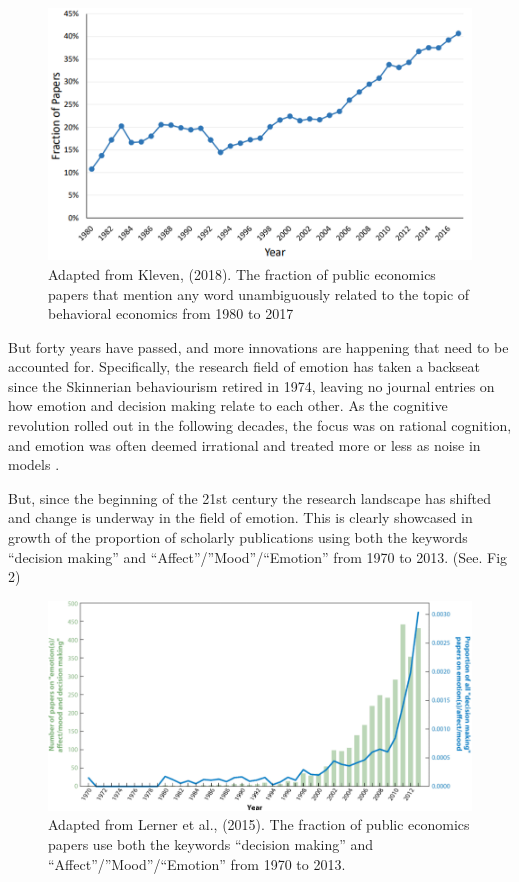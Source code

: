 \documentclass{article}
\begin{document}
    \begin{figure}[H]
        \begin{centering}
        \includegraphics[width = \textwidth]{figures/Billede 3.png}
        \caption{Adapted from Kleven, (2018). The fraction of public economics papers that mention any word unambiguously related to the topic of behavioral economics from 1980 to 2017}
        \end{centering}
    \end{figure}

    But forty years have passed, and more innovations are happening that need to be accounted for. Specifically, the research field of emotion has taken a backseat since the Skinnerian behaviourism retired in 1974, leaving no journal entries on how emotion and decision making relate to each other. As the cognitive revolution rolled out in the following decades, the focus was on rational cognition, and emotion was often deemed irrational and treated more or less as noise in models \cite{barrett2019historical}.
 
But, since the beginning of the 21st century the research landscape has shifted and change is underway in the field of emotion. This is clearly showcased in growth of the proportion of scholarly publications using both the keywords “decision making” and “Affect”/”Mood”/“Emotion” from 1970 to 2013. (See. Fig 2)
    
\begin{figure}[H]
    \begin{centering}
    \includegraphics[width = \textwidth]{figures/Billede 4.png}
    \caption{Adapted from Lerner et al., (2015). The fraction of public economics papers use both the keywords “decision making” and “Affect”/”Mood”/“Emotion” from 1970 to 2013.}
    \end{centering}
\end{figure}
\end{document}
